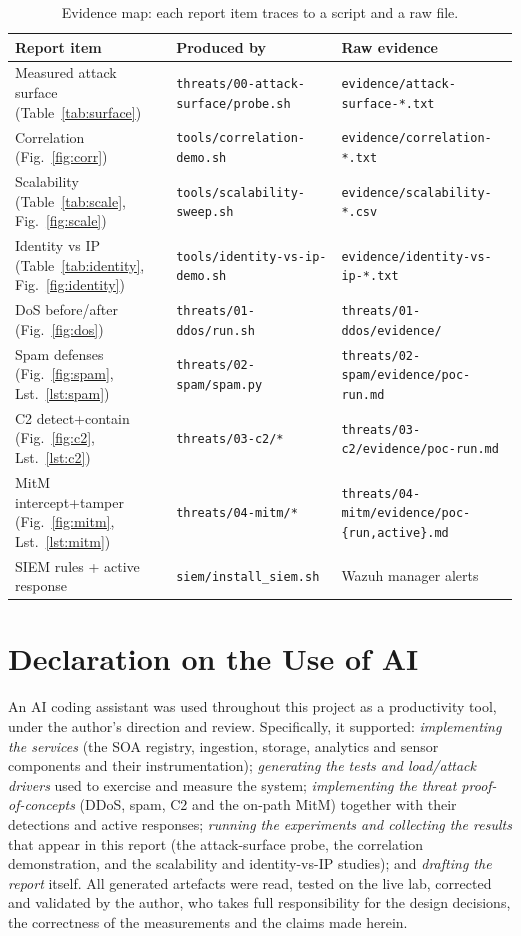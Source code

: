 \documentclass[11pt,a4paper]{article}
\newcommand{\code}[1]{\texttt{\small #1}}
\begin{document}
\begin{table}[htbp]
\centering\footnotesize
\caption{Evidence map: each report item traces to a script and a raw file.}
\label{tab:evidence}
\setlength{\tabcolsep}{4pt}
\begin{tabular}{@{}>{\raggedright\arraybackslash}p{4.2cm} l l@{}}
\toprule
\textbf{Report item} & \textbf{Produced by} & \textbf{Raw evidence}\\
\midrule
Measured attack surface (Table~\ref{tab:surface}) & \code{threats/00-attack-surface/probe.sh} & \code{evidence/attack-surface-*.txt}\\
Correlation (Fig.~\ref{fig:corr}) & \code{tools/correlation-demo.sh} & \code{evidence/correlation-*.txt}\\
Scalability (Table~\ref{tab:scale}, Fig.~\ref{fig:scale}) & \code{tools/scalability-sweep.sh} & \code{evidence/scalability-*.csv}\\
Identity vs IP (Table~\ref{tab:identity}, Fig.~\ref{fig:identity}) & \code{tools/identity-vs-ip-demo.sh} & \code{evidence/identity-vs-ip-*.txt}\\
DoS before/after (Fig.~\ref{fig:dos}) & \code{threats/01-ddos/run.sh} & \code{threats/01-ddos/evidence/}\\
Spam defenses (Fig.~\ref{fig:spam}, Lst.~\ref{lst:spam}) & \code{threats/02-spam/spam.py} & \code{threats/02-spam/evidence/poc-run.md}\\
C2 detect+contain (Fig.~\ref{fig:c2}, Lst.~\ref{lst:c2}) & \code{threats/03-c2/*} & \code{threats/03-c2/evidence/poc-run.md}\\
MitM intercept+tamper (Fig.~\ref{fig:mitm}, Lst.~\ref{lst:mitm}) & \code{threats/04-mitm/*} & \code{threats/04-mitm/evidence/poc-\{run,active\}.md}\\
SIEM rules + active response & \code{siem/install\_siem.sh} & Wazuh manager alerts\\
\bottomrule
\end{tabular}
\end{table}

\section*{Declaration on the Use of AI}
An AI coding assistant was used throughout this project as a productivity tool, under the
author's direction and review. Specifically, it supported: \emph{implementing the services}
(the SOA registry, ingestion, storage, analytics and sensor components and their
instrumentation); \emph{generating the tests and load/attack drivers} used to exercise and
measure the system; \emph{implementing the threat proof-of-concepts} (DDoS, spam, C2 and the
on-path MitM) together with their detections and active responses; \emph{running the
experiments and collecting the results} that appear in this report (the attack-surface probe,
the correlation demonstration, and the scalability and identity-vs-IP studies); and
\emph{drafting the report} itself. All generated artefacts were read, tested on the live lab,
corrected and validated by the author, who takes full responsibility for the design decisions,
the correctness of the measurements and the claims made herein.
\end{document}
